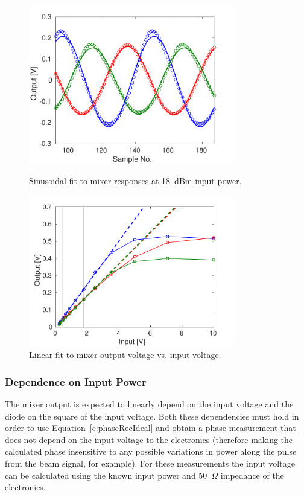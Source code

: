 \begin{figure}
  \centering
  \includegraphics[width=0.8\textwidth]{Figures/phaseMons/mixersFit18dBm}
  \caption{Sinusoidal fit to mixer responses at 18~dBm input power.}
  \label{f:mixersFit18dBm}
  \includegraphics[width=0.8\textwidth]{Figures/phaseMons/LinFitMixerVsVolts}
  \caption{Linear fit to mixer output voltage vs. input voltage.}
  \label{f:LinFitMixerVsVolts}
\end{figure}

\subsubsection{Dependence on Input Power}

The mixer output is expected to linearly depend on the input voltage and the diode on the square of the input voltage. Both these dependencies must hold in order to use Equation~\ref{e:phaseRecIdeal} and obtain a phase measurement that does not depend on the input voltage to the electronics (therefore making the calculated phase insensitive to any possible variations in power along the pulse from the beam signal, for example). For these measurements the input voltage can be calculated using the known input power and 50~\(\Omega\) impedance of the electronics.

